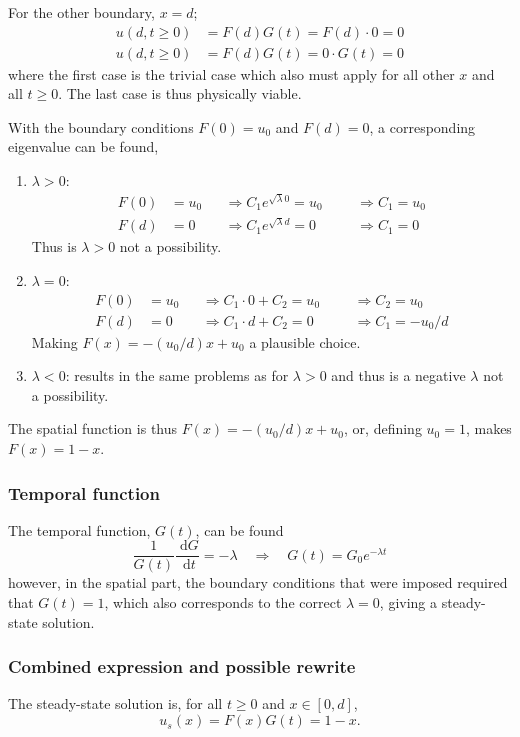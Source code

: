 \documentclass[a4paper,11pt]{article}
\newcommand{\diff}{\ensuremath{\; \text{d}}}
\begin{document}
For the other boundary, $x=d$;
\begin{align*}
    u(d,t\geq 0) &= F(d)G(t) = F(d) \cdot 0 = 0 \\
    u(d,t\geq 0) &= F(d)G(t) = 0\cdot    G(t) = 0
\end{align*}
where the first case is the trivial case which also must apply for all other $x$ and all $t\geq0$. The last case is thus physically viable.

With the boundary conditions $F(0) = u_0$ and $F(d) = 0$, a corresponding eigenvalue can be found, 
\begin{enumerate}
\item $\lambda > 0$:
    \begin{align*}
        F(0) &= u_0 &&\Rightarrow C_1 e^{\sqrt{\lambda} 0} = u_0 &&&\Rightarrow C_1 = u_0 \\
    F(d) &= 0 &&\Rightarrow C_1 e^{\sqrt{\lambda} d} = 0 &&&\Rightarrow C_1 = 0
    \end{align*}
    Thus is $\lambda > 0$ not a possibility.
\item $\lambda = 0$:
    \begin{align*}
        F(0) &= u_0 &&\Rightarrow C_1 \cdot 0 + C_2 = u_0   &&&\Rightarrow C_2 = u_0 \\
        F(d) &= 0   &&\Rightarrow C_1 \cdot d + C_2 = 0     &&&\Rightarrow C_1 = -u_0/d
    \end{align*}
    Making $F(x) = -(u_0/d)x + u_0$ a plausible choice.
\item $\lambda < 0$: results in the same problems as for $\lambda > 0$ and thus is a negative $\lambda$ not a possibility.
\end{enumerate}

The spatial function is thus $F(x) = -(u_0/d)x + u_0$, or, defining $u_0 = 1$, makes $F(x) = 1 - x$.

\subsubsection{Temporal function}
The temporal function, $G(t)$, can be found
\[ \frac{1}{G(t)} \frac{\diff G}{\diff t} = -\lambda \quad\Rightarrow\quad
G(t) = G_0 e^{-\lambda t} \]
however, in the spatial part, the boundary conditions that were imposed required that $G(t) = 1$, which also corresponds to the correct $\lambda = 0$, giving a steady-state solution.

\subsubsection{Combined expression and possible rewrite}
The steady-state solution is, for all $t\geq 0$ and $x\in[0,d]$,
\begin{equation}
    u_s(x) = F(x)G(t) = 1 - x.
    \label{eq:steadystate}
\end{equation}
\end{document}
